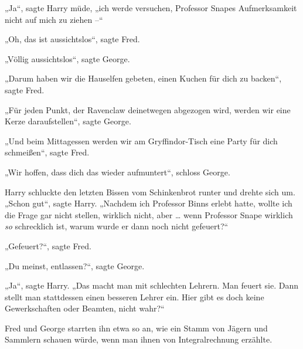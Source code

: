 „Ja“, sagte Harry müde, „ich werde versuchen, Professor Snapes Aufmerksamkeit nicht auf mich zu ziehen –“ 

„Oh, das ist aussichtslos“, sagte Fred. 

„Völlig aussichtslos“, sagte George. 

„Darum haben wir die Hauselfen gebeten, einen Kuchen für dich zu backen“, sagte Fred. 

„Für jeden Punkt, der Ravenclaw deinetwegen abgezogen wird, werden wir eine Kerze daraufstellen“, sagte George. 

„Und beim Mittagessen werden wir am Gryffindor-Tisch eine Party für dich schmeißen“, sagte Fred. 

„Wir hoffen, dass dich das wieder aufmuntert“, schloss George. 

Harry schluckte den letzten Bissen vom Schinkenbrot runter und drehte sich um. „Schon gut“, sagte Harry. „Nachdem ich Professor Binns erlebt hatte, wollte ich die Frage gar nicht stellen, wirklich nicht, aber … wenn Professor Snape wirklich \emph{so} schrecklich ist, warum wurde er dann noch nicht gefeuert?“ 

„Gefeuert?“, sagte Fred. 

„Du meinst, entlassen?“, sagte George. 

„Ja“, sagte Harry. „Das macht man mit schlechten Lehrern. Man feuert sie. Dann stellt man stattdessen einen besseren Lehrer ein. Hier gibt es doch keine Gewerkschaften oder Beamten, nicht wahr?“ 

Fred und George starrten ihn etwa so an, wie ein Stamm von Jägern und Sammlern schauen würde, wenn man ihnen von Integralrechnung erzählte. 

